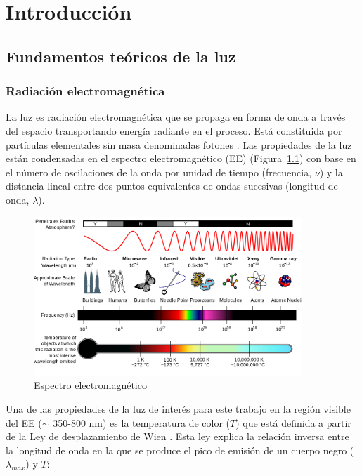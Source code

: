 \chapter{Introducción}


\section{Fundamentos teóricos de la luz}

\subsection{Radiación electromagnética}

La luz es radiación electromagnética que se propaga en forma de onda a través del espacio transportando energía radiante en el proceso. Está constituida por partículas elementales sin masa denominadas fotones \citep{Purcell&Morin2013}. Las propiedades de la luz están condensadas en el espectro electromagnético (EE) (Figura~\ref{espectroelectromagnetico}) con base en el número de oscilaciones de la onda por unidad de tiempo (frecuencia, $\nu$) y la distancia lineal entre dos puntos equivalentes de ondas sucesivas (longitud de onda, $\lambda$).\\

\begin{figure}
  \centering
    \includegraphics[width=0.9\textwidth]{espectroelectromagnetico}
  \caption{Espectro electromagnético \citep{NASA2007}}
  \label{espectroelectromagnetico}
\end{figure}

Una de las propiedades de la luz de interés para este trabajo en la región visible del EE ($\sim$ 350-800 nm) es la temperatura de color ($T$)  que está definida a partir de la Ley de desplazamiento de Wien \citep{Halliday&Resnick2008}. Esta ley explica la relación inversa entre la longitud de onda en la que se produce el pico de emisión de un cuerpo negro ($\lambda_{max}$) y $T$:

